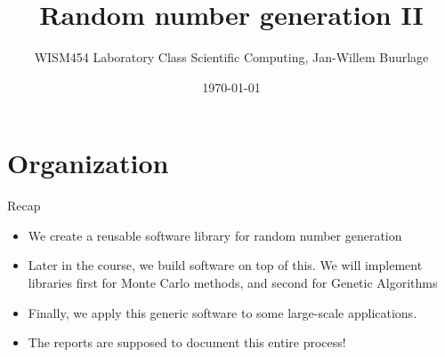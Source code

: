 \documentclass[10pt]{beamer}
\author{WISM454 Laboratory Class Scientific Computing, Jan-Willem Buurlage}
\date{\today}
\title{Random number generation II}
\begin{document}
\maketitle

\section{Organization}
\label{sec:org9ac47b3}
\begin{frame}[label={sec:org6dbaf68}]{Recap}
\begin{itemize}
\item We create a reusable software library for \alert{random number generation}
\item Later in the course, we build software on top of this. We will implement libraries first for \alert{Monte Carlo methods}, and second for \alert{Genetic Algorithms}
\item Finally, we apply this generic software to some large-scale applications.
\item The reports are supposed to document this entire process!
\end{itemize}
\end{frame}
\end{document}

